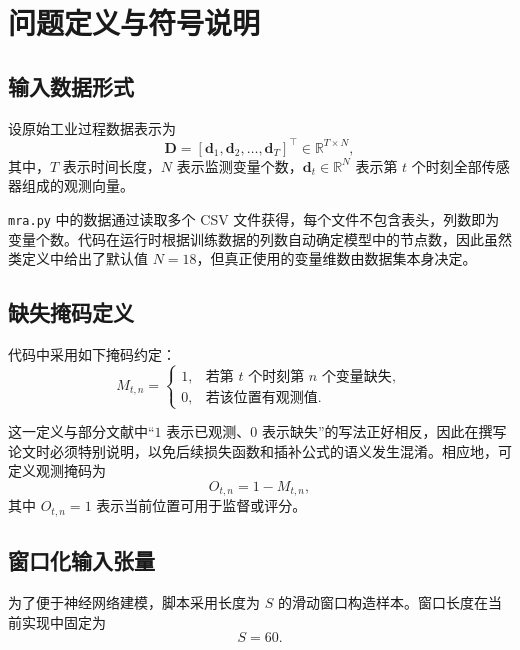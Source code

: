 \section{问题定义与符号说明}

\subsection{输入数据形式}

设原始工业过程数据表示为
\begin{equation}
    \mathbf{D} = [\mathbf{d}_1, \mathbf{d}_2, \ldots, \mathbf{d}_T]^\top \in \mathbb{R}^{T \times N},
\end{equation}
其中，$T$ 表示时间长度，$N$ 表示监测变量个数，$\mathbf{d}_t \in \mathbb{R}^{N}$ 表示第 $t$ 个时刻全部传感器组成的观测向量。

\texttt{mra.py} 中的数据通过读取多个 CSV 文件获得，每个文件不包含表头，列数即为变量个数。代码在运行时根据训练数据的列数自动确定模型中的节点数，因此虽然类定义中给出了默认值 $N=18$，但真正使用的变量维数由数据集本身决定。

\subsection{缺失掩码定义}

代码中采用如下掩码约定：
\begin{equation}
    M_{t,n} =
    \begin{cases}
        1, & \text{若第 } t \text{ 个时刻第 } n \text{ 个变量缺失}, \\
        0, & \text{若该位置有观测值}.
    \end{cases}
\end{equation}

这一定义与部分文献中“$1$ 表示已观测、$0$ 表示缺失”的写法正好相反，因此在撰写论文时必须特别说明，以免后续损失函数和插补公式的语义发生混淆。相应地，可定义观测掩码为
\begin{equation}
    O_{t,n} = 1 - M_{t,n},
\end{equation}
其中 $O_{t,n}=1$ 表示当前位置可用于监督或评分。

\subsection{窗口化输入张量}

为了便于神经网络建模，脚本采用长度为 $S$ 的滑动窗口构造样本。窗口长度在当前实现中固定为
\begin{equation}
    S = 60.
\end{equation}


